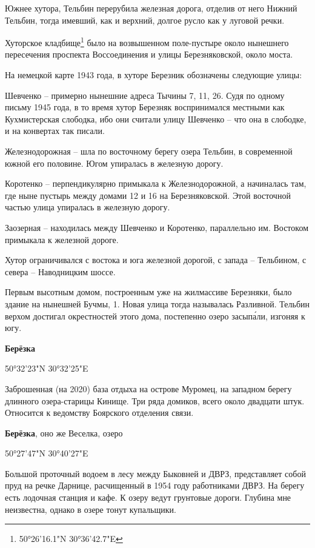 Южнее хутора, Тельбин перерубила железная дорога, отделив от него Нижний Тельбин, тогда имевший, как и верхний, долгое русло как у луговой речки.

Хуторское кладбище\footnote{50°26'16.1"N 30°36'42.7"E} было на возвышенном поле-пустыре около нынешнего пересечения проспекта Воссоединения и улицы Березняковской, около моста.

На немецкой карте 1943 года, в хуторе Березник обозначены следующие улицы: 

Шевченко – примерно нынешние адреса Тычины 7, 11, 26. Судя по одному письму 1945 года, в то время хутор Березняк воспринимался местными как Кухмистерская слободка, ибо они считали улицу Шевченко – что она в слободке, и на конвертах так писали.

Железнодорожная – шла по восточному берегу озера Тельбин, в современной южной его половине. Югом упиралась в железную дорогу.

Коротенко – перпендикулярно примыкала к Железнодорожной, а начиналась там, где ныне пустырь между домами 12 и 16 на Березняковской. Этой восточной частью улица упиралась в железную дорогу.

Заозерная – находилась между Шевченко и Коротенко, параллельно им. Востоком примыкала к железной дороге.

Хутор ограничивался с востока и юга железной дорогой, с запада – Тельбином, с севера – Наводницким шоссе.

Первым высотным домом, построенным уже на жилмассиве Березняки, было здание на нынешней Бучмы, 1. Новая улица тогда называлась Разливной. Тельбин верхом достигал окрестностей этого дома, постепенно озеро засып\'али, изгоняя к югу.\\

\medskip

\textbf{Берёзка} 

50°32'23"N 30°32'25"E

Заброшенная (на 2020) база отдыха на острове Муромец, на западном берегу длинного озера-старицы Кинище. Три ряда домиков, всего около двадцати штук. Относится к ведомству Боярского отделения связи.\\

\medskip

\textbf{Берёзка}, оно же Веселка, озеро

50°27'47"N 30°40'27"E

Большой проточный водоем в лесу между Быковней и ДВРЗ, представляет собой пруд на речке Дарнице, расчищенный в 1954 году работниками ДВРЗ. На берегу есть лодочная станция и кафе. К озеру ведут грунтовые дороги. Глубина мне неизвестна, однако в озере тонут купальщики.

